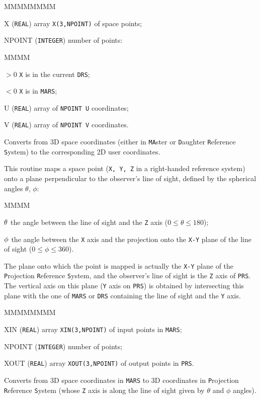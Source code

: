 \begin{DLtt}{MMMMMMMM}
\item[X]      ({\tt REAL}) array {\tt X(3,NPOINT)} of space points;
\item[NPOINT] ({\tt INTEGER}) number of points:
\begin{DLtt}{MMMM}
\item[$>$0] {\tt X} is in the current {\tt DRS};
\item[$<$0] {\tt X} is in {\tt MARS};
\end{DLtt}
\item[U]  ({\tt REAL}) array of {\tt NPOINT U} coordinates;
\item[V]  {(\tt REAL}) array of {\tt NPOINT V} coordinates.
\end{DLtt}
Converts from 3D space coordinates (either in {\tt MA}ster or 
{\tt D}aughter {\tt R}eference {\tt S}ystem) to the corresponding 2D 
user coordinates.
 
This routine maps a space point ({\tt X, Y, Z} in a right-handed reference 
system) onto a plane perpendicular to the observer's line of sight,
defined by the spherical angles $\theta$, $\phi$:
\begin{DLtt}{MMMM}
\item[${\tt \theta}$] the angle between the line of sight and the {\tt Z} 
axis ($0 \leq \theta \leq 180$);
\item[${\tt \phi}$] the angle between the {\tt X} axis and the projection 
onto the {\tt X-Y} plane of the line of sight ($0 \leq \phi \leq 360$).
\end{DLtt}
The plane onto which the point is mapped is actually the {\tt X-Y} plane 
of the {\tt P}rojection {\tt R}eference {\tt S}ystem, and
the observer's line of sight is the {\tt Z} axis of {\tt PRS}. The vertical 
axis on
this plane ({\tt Y} axis on {\tt PRS}) is obtained by intersecting this plane
with the one of {\tt MARS} or {\tt DRS} containing the line of sight and 
the {\tt Y} axis.

\begin{DLtt}{MMMMMMMM}
\item[XIN]   ({\tt REAL}) array {\tt XIN(3,NPOINT)} of input points in 
{\tt MARS};
\item[NPOINT] ({\tt INTEGER}) number of points;
\item[XOUT]   ({\tt REAL}) array {\tt XOUT(3,NPOINT)} of output points 
in {\tt PRS}.
\end{DLtt}
Converts from 3D space coordinates in {\tt MARS}
to 3D coordinates in {\tt P}rojection {\tt R}eference 
{\tt S}ystem (whose {\tt Z} axis is along
the line of sight given by $\theta$ and $\phi$ angles).

